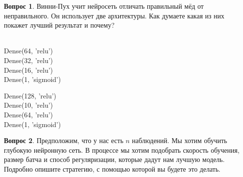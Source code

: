 \documentclass[12pt]{article}
\theoremstyle{definition}
\newtheorem{question}{Вопрос}
\begin{document}
\begin{question}
Винни-Пух учит нейросеть отличать правильный мёд от неправильного. Он использует две архитектуры. Как думаете какая из них покажет лучший результат и почему? \\ \\


\noindent \begin{minipage}{0.48\textwidth}
\centering
Dense(64, 'relu') \\
Dense(32, 'relu') \\
Dense(16, 'relu') \\
Dense(1, 'sigmoid') \\
\end{minipage}
\hfill
\begin{minipage}{0.48\textwidth}
\centering
Dense(128, 'relu')  \\
Dense(10, 'relu')   \\
Dense(64, 'relu')   \\
Dense(1, 'sigmoid')  \\
\end{minipage}
\end{question}


\vspace{5cm} 

\begin{question}
Предположим, что у нас есть $n$ наблюдений. Мы хотим обучить глубокую нейронную сеть. В процессе мы хотим подобрать скорость обучения, размер батча и способ регуляризации, которые дадут нам лучшую модель. Подробно опишите стратегию, с помощью которой вы будете это делать. 
\end{question}
\end{document}
